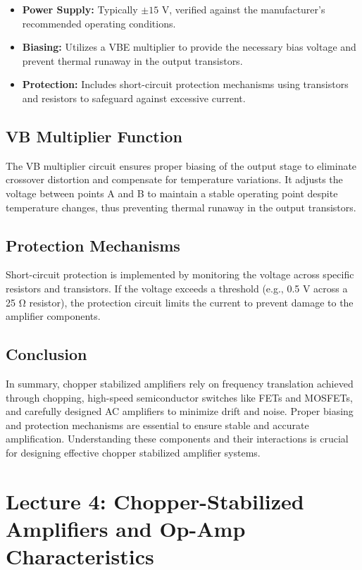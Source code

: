 \begin{itemize}
    \item \textbf{Power Supply:} Typically $\pm15$ V, verified against the manufacturer's recommended operating conditions.
    \item \textbf{Biasing:} Utilizes a VBE multiplier to provide the necessary bias voltage and prevent thermal runaway in the output transistors.
    \item \textbf{Protection:} Includes short-circuit protection mechanisms using transistors and resistors to safeguard against excessive current.
\end{itemize}

\subsection{VB Multiplier Function}
The VB multiplier circuit ensures proper biasing of the output stage to eliminate crossover distortion and compensate for temperature variations. It adjusts the voltage between points A and B to maintain a stable operating point despite temperature changes, thus preventing thermal runaway in the output transistors.

\subsection{Protection Mechanisms}
Short-circuit protection is implemented by monitoring the voltage across specific resistors and transistors. If the voltage exceeds a threshold (e.g., 0.5 V across a 25 Ω resistor), the protection circuit limits the current to prevent damage to the amplifier components.

\subsection{Conclusion}
In summary, chopper stabilized amplifiers rely on frequency translation achieved through chopping, high-speed semiconductor switches like FETs and MOSFETs, and carefully designed AC amplifiers to minimize drift and noise. Proper biasing and protection mechanisms are essential to ensure stable and accurate amplification. Understanding these components and their interactions is crucial for designing effective chopper stabilized amplifier systems.

\section{Lecture 4: Chopper-Stabilized Amplifiers and Op-Amp Characteristics}

